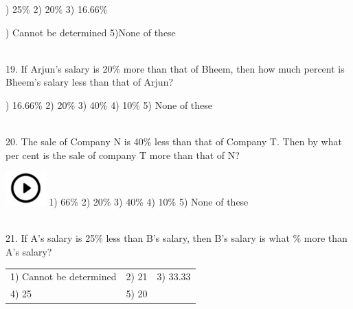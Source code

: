 \documentclass{article}
\begin{document}
\noindent 

) 25\%                                                            2) 20\%                           3) 16.66\%

\noindent 

) Cannot be determined                            5)None of these

\noindent 

\noindent 

\noindent 

\noindent 

\noindent \\  19. If Arjun's salary is 20\% more than that of Bheem, then how much percent is Bheem's salary less than that of Arjun?

\noindent 

) 16.66\%               2) 20\%              3) 40\%              4) 10\%              5) None of these

\noindent 

\noindent 

\noindent 

\noindent \\ 20. The sale of Company N is 40\% less than that of Company T. Then by what per cent is the sale of company T more than that of N?

\noindent \includegraphics*[width=0.61in, height=0.52in]{images/image1} 1) 66\%                    2) 20\%              3) 40\%              4) 10\%              5) None of these

\noindent 

\noindent 

\noindent 

\noindent \\ 21. If A's salary is 25\% less than B's salary, then B's salary is what \% more than A's salary?

\noindent 

\begin{tabular}{p{2.0in} p{1.1in} p{0.9in} }  
1) Cannot be determined & 2) 21 & 3) 33.33 \\ 
4) 25 & 5) 20 &  \\ 
\end{tabular}



\noindent 
\end{document}
